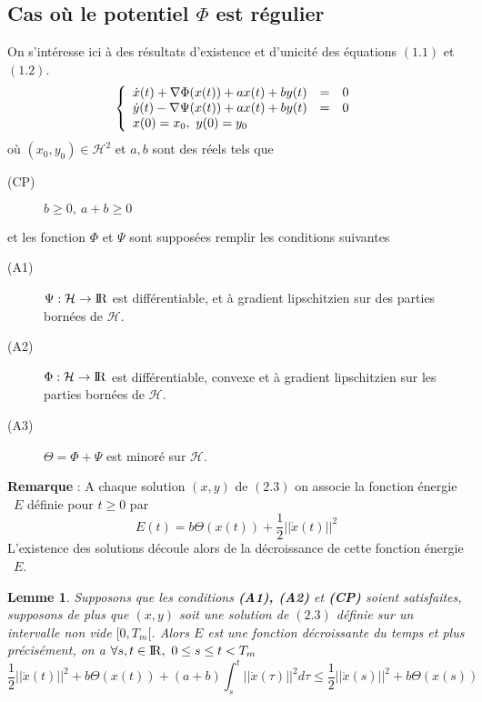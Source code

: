 \documentclass[a4paper,11pt]{book}
\theoremstyle{theo}
\newtheorem{lemma}[theorem]{Lemme}
\newcommand*{\R}{{\rm I\!R}}
\newcommand*{\Hi}{\mathcal{H}}
\begin{document}
\subsection{Cas où le potentiel $\Phi$ est régulier}
On s'intéresse ici à des résultats d'existence et d'unicité des équations $(1.1)$ et $(1.2)$. 
\begin{equation} \left\{
\begin{array}{l l l}
\dot{x}(t) + \nabla\Phi(x(t)) + ax(t) + by(t) &=& 0\\
\dot{y}(t) - \nabla\Psi(x(t)) + ax(t) + by(t) &=& 0 \\
x(0)=x_0, ~y(0)=y_0 
\end{array}
\right. 
\end{equation}
où $(x_0,y_0) \in \Hi^2$ et $a,b$ sont des réels	tels que
\medskip
\begin{description}
\item[(CP)] $b\geq 0, ~a+b\geq 0$
\end{description}
\medskip
et les fonction $\Phi$ et $\Psi$ sont supposées remplir les conditions suivantes
\medskip
\begin{description}
\item[(A1)] $\Psi : \Hi \to \R$ est différentiable, et à gradient lipschitzien sur des parties bornées de $\Hi$.
\medskip
\item[(A2)] $\Phi : \Hi \to \R$ est différentiable, convexe et à gradient lipschitzien sur les parties bornées de $\Hi$.
\medskip
\item[(A3)] $\Theta = \Phi+\Psi$ est minoré	sur $\Hi$.
\end{description}
\bigskip
\textbf{Remarque} : A chaque solution $(x,y)$ de $(2.3)$ on associe la fonction \og énergie \fg ~$E$ définie pour $t\geq 0$ par 
$$ E(t) = b\Theta(x(t))+\frac{1}{2}||\dot{x}(t)||^2 $$
L'existence des solutions découle alors de la décroissance de cette fonction \og énergie \fg ~$E$.

\begin{lemma}
Supposons que les conditions \textbf{\upshape(A1), (A2)} et \textbf{\upshape (CP)} soient satisfaites, supposons de plus que $(x,y)$ soit une solution de $(2.3)$ définie sur un intervalle non vide $[0,T_m[$. Alors $E$ est une fonction décroissante du temps et plus précisément, on a $ \forall s,t \in {\rm I\!R}, ~ 0\leq s \leq t < T_m$
\begin{equation}
\frac{1}{2}||\dot{x}(t)||^2 +  b\Theta(x(t))+(a+b)\int_{s}^t||\dot{x}(\tau)||^2 d\tau \leq \frac{1}{2}||\dot{x}(s)||^2 +  b\Theta(x(s))
\end{equation}
\end{lemma}
\end{document}
